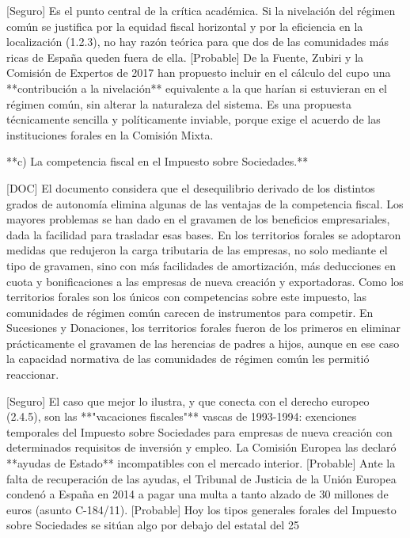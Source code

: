\documentclass[10pt,a4paper]{article}
\begin{document}
[Seguro] Es el punto central de la crítica académica. Si la nivelación del régimen común se justifica por la equidad fiscal horizontal y por la eficiencia en la localización (1.2.3), no hay razón teórica para que dos de las comunidades más ricas de España queden fuera de ella. [Probable] De la Fuente, Zubiri y la Comisión de Expertos de 2017 han propuesto incluir en el cálculo del cupo una **contribución a la nivelación** equivalente a la que harían si estuvieran en el régimen común, sin alterar la naturaleza del sistema. Es una propuesta técnicamente sencilla y políticamente inviable, porque exige el acuerdo de las instituciones forales en la Comisión Mixta.

**c) La competencia fiscal en el Impuesto sobre Sociedades.**

[DOC] El documento considera que el desequilibrio derivado de los distintos grados de autonomía elimina algunas de las ventajas de la competencia fiscal. Los mayores problemas se han dado en el gravamen de los beneficios empresariales, dada la facilidad para trasladar esas bases. En los territorios forales se adoptaron medidas que redujeron la carga tributaria de las empresas, no solo mediante el tipo de gravamen, sino con más facilidades de amortización, más deducciones en cuota y bonificaciones a las empresas de nueva creación y exportadoras. Como los territorios forales son los únicos con competencias sobre este impuesto, las comunidades de régimen común carecen de instrumentos para competir. En Sucesiones y Donaciones, los territorios forales fueron de los primeros en eliminar prácticamente el gravamen de las herencias de padres a hijos, aunque en ese caso la capacidad normativa de las comunidades de régimen común les permitió reaccionar.

[Seguro] El caso que mejor lo ilustra, y que conecta con el derecho europeo (2.4.5), son las **"vacaciones fiscales"** vascas de 1993-1994: exenciones temporales del Impuesto sobre Sociedades para empresas de nueva creación con determinados requisitos de inversión y empleo. La Comisión Europea las declaró **ayudas de Estado** incompatibles con el mercado interior. [Probable] Ante la falta de recuperación de las ayudas, el Tribunal de Justicia de la Unión Europea condenó a España en 2014 a pagar una multa a tanto alzado de 30 millones de euros (asunto C-184/11). [Probable] Hoy los tipos generales forales del Impuesto sobre Sociedades se sitúan algo por debajo del estatal del 25%
\end{document}
